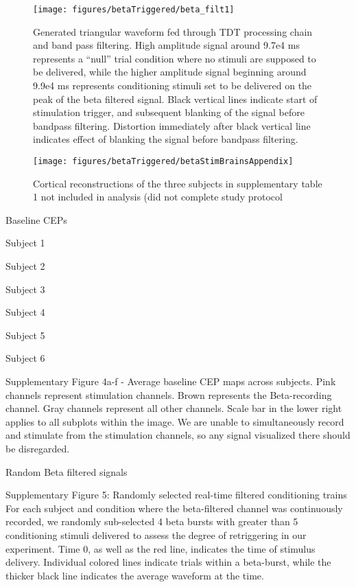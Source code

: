 \begin{figure}[ht]
	\centering
	\texttt{[image: figures/betaTriggered/beta\_filt1]}
	\caption[Real time tracking of triangular waveform]{Generated triangular waveform fed through TDT processing chain and band pass filtering. High amplitude signal around 9.7e4 ms represents a “null” trial condition where no stimuli are supposed to be delivered, while the higher amplitude signal beginning around 9.9e4 ms represents conditioning stimuli set to be delivered on the peak of the beta filtered signal. Black vertical lines indicate start of stimulation trigger, and subsequent blanking of the signal before bandpass filtering. Distortion immediately after black vertical line indicates effect of blanking the signal before bandpass filtering. 	}
	\label{fig:betaStimTriangular}
\end{figure}


\begin{figure}[ht]
	\centering
	\texttt{[image: figures/betaTriggered/betaStimBrainsAppendix]}
	\caption[Additional cortical reconstructions]{Cortical reconstructions of the three subjects in supplementary table 1 not included in analysis (did not complete study protocol	}
	\label{fig:betaStimBrainsAppendix}
\end{figure}
Baseline CEPs

Subject 1

Subject 2


Subject 3


Subject 4


Subject 5

Subject 6



Supplementary Figure 4a-f - Average baseline CEP maps across subjects. Pink channels represent stimulation channels. Brown represents the Beta-recording channel. Gray channels represent all other channels. Scale bar in the lower right applies to all subplots within the image. We are unable to simultaneously record and stimulate from the stimulation channels, so any signal visualized there should be disregarded. 

Random Beta filtered signals


Supplementary Figure 5: Randomly selected real-time filtered conditioning trains For each subject and condition where the beta-filtered channel was continuously recorded, we randomly sub-selected 4 beta bursts with greater than 5 conditioning stimuli delivered to assess the degree of retriggering in our experiment. Time 0, as well as the red line, indicates the time of stimulus delivery. Individual colored lines indicate trials within a beta-burst, while the thicker black line indicates the average waveform at the time. 





